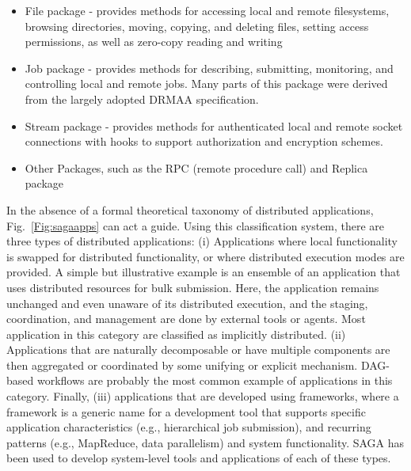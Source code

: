 \documentclass[conference,final]{IEEEtran}
\begin{document}
\begin{itemize}
\item File package - provides methods for accessing local and remote
 filesystems, browsing directories, moving, copying, and deleting
 files, setting access permissions, as well as zero-copy reading and
 writing
\item Job package - provides methods for describing, submitting,
 monitoring, and controlling local and remote jobs. Many parts of
 this package were derived from the largely adopted
 DRMAA %
 specification.
\item Stream package - provides methods for authenticated local and
 remote socket connections with hooks to support authorization and
 encryption schemes.
\item Other Packages, such as the RPC (remote procedure call) and Replica
 package
\end{itemize}

In the absence of a formal theoretical taxonomy of distributed
applications, Fig.~\ref{Fig:sagaapps} can act a guide.  Using this
classification system, there are three types of distributed
applications: (i) Applications where local functionality is swapped
for distributed functionality, or where distributed execution modes
are provided.  A simple but illustrative example is an ensemble of an
application that uses distributed resources for bulk submission. Here,
the application remains unchanged and even unaware of its distributed
execution, and the staging, coordination, and management are done by
external tools or agents. Most application in this category are
classified as implicitly distributed.  (ii) Applications that are
naturally decomposable or have multiple components are then aggregated
or coordinated by some unifying or explicit mechanism.  DAG-based
workflows are probably the most common example of applications in this
category.
Finally, (iii) applications that are developed using frameworks, where
a framework is a generic name for a development tool that supports
specific application characteristics (e.g., hierarchical job
submission), and recurring patterns (e.g., MapReduce, data
parallelism) and system functionality.  SAGA has been used to develop
system-level tools and applications of each of these types.
\end{document}
